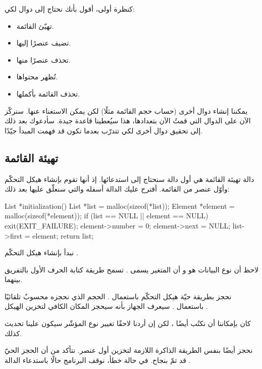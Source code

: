 كنظرة أولى، أقول بأنك نحتاج إلى دوال لكي:

\begin{itemize}
	\item تهيّئ القائمة.
	\item تضيف عنصرًا إليها.
	\item تحذف عنصرًا منها.
	\item تُظهر محتواها.
	\item تحذف القائمة بأكملها.
\end{itemize}

يمكننا إنشاء دوال أخرى (حساب حجم القائمة مثلًا) لكن يمكن الاستغناء عنها. سنركّز الآن على الدوال التي قمتُ الآن بتعدادها، هذا سيُعطينا قاعدة جيدة. سأدعوك بعد ذلك إلى تحقيق دوال أخرى لكي تتدرّب بعدما تكون قد فهمت المبدأ جيّدًا.

\subsection{تهيئة القائمة}

دالة تهيئة القائمة هي أول دالة سنحتاج إلى استدعائها. إذ أنها تقوم بإنشاء هيكل التحكّم وأوّل عنصر من القائمة. أقترح عليك الدالة أسفله والتي سنعلّق عليها بعد ذلك:

\begin{Csource}
List *initialization()
{
	List *list = malloc(sizeof(*list));
	Element *element = malloc(sizeof(*element));
	if (list == NULL || element == NULL)
	{
		exit(EXIT_FAILURE);
	}
	element->number = 0;
	element->next = NULL;
	list->first = element;
	return list;
}
\end{Csource}

نبدأ بإنشاء هيكل التحكّم 
.

\begin{information}
لاحظ أن نوع البيانات هو
و أن المتغير يسمى
.
تسمح طريقة كتابة الحرف الأول بالتفريق بينهما.
\end{information}

نحجز بطريقة حيّة هيكل التحكّم باستعمال 
.
الحجم الذي نحجزه محسوبٌ تلقائيًا باستعمال
.
سيعرف الجهاز بأنه سيحجز المكان الكافي لتخزين الهيكل
.

\begin{information}
 كان بإمكاننا أن نكتُب أيضًا
،
لكن إن أردنا لاحقًا تغيير نوع المؤشّر
سيكون علينا تحديث
كذلك.
\end{information}

نحجز أيضًا بنفس الطريقة الذاكرة اللازمة لتخزين أول عنصر. نتأكد من أن الحجز الحيّ قد تمّ بنجاح. في حالة خطأ، نوقف البرنامج حالًا باستدعاء الدالة
.

